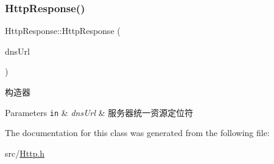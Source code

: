 \subsubsection{\texorpdfstring{Http\+Response()}{HttpResponse()}}
{\footnotesize\ttfamily Http\+Response\+::\+Http\+Response (\begin{DoxyParamCaption}\item[{\hyperlink{class_dns_url}{Dns\+Url} const \&}]{dns\+Url }\end{DoxyParamCaption})\hspace{0.3cm}{\ttfamily [inline]}}



构造器 


\begin{DoxyParams}[1]{Parameters}
\mbox{\tt in}  & {\em dns\+Url} & 服务器统一资源定位符 \\
\hline
\end{DoxyParams}


The documentation for this class was generated from the following file\+:\begin{DoxyCompactItemize}
\item 
src/\hyperlink{_http_8h}{Http.\+h}\end{DoxyCompactItemize}
